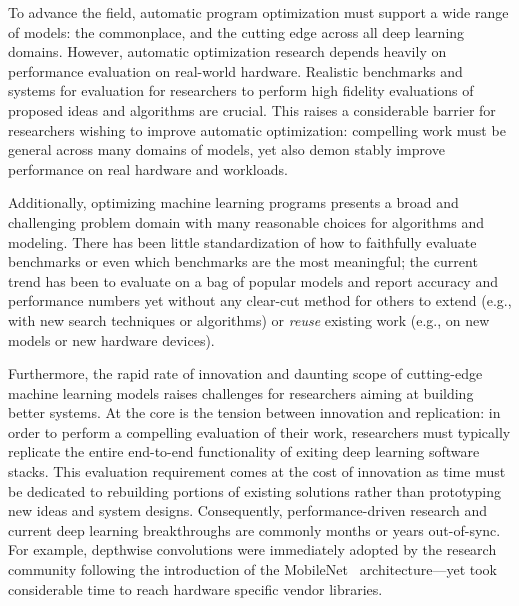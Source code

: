 To advance the field, automatic program optimization must support a wide range of models: the commonplace, and the cutting edge across all deep learning domains.
However, automatic optimization research depends heavily on performance evaluation on real-world hardware.
Realistic benchmarks and systems for evaluation for researchers to perform high fidelity evaluations of proposed ideas and algorithms are crucial.
This raises a considerable barrier for researchers wishing to improve automatic optimization: compelling work must be general across many domains of models, yet also demon stably improve performance on real hardware and workloads.

Additionally, optimizing machine learning programs presents a broad and challenging problem domain with many reasonable choices for algorithms and modeling.
There has been little standardization of how to faithfully evaluate benchmarks or even which benchmarks are the most meaningful; the current trend has been to evaluate on a bag of popular models and report accuracy and performance numbers yet without any clear-cut method for others to extend (e.g., with new search techniques or algorithms) or \emph{reuse} existing work (e.g., on new models or new hardware devices).

Furthermore, the rapid rate of innovation and daunting scope of cutting-edge machine learning models raises challenges for researchers aiming at building better systems.
At the core is the tension between innovation and replication: in order to perform a compelling evaluation of their work, researchers must typically replicate the entire end-to-end functionality of exiting deep learning software stacks.
This evaluation requirement comes at the cost of innovation as time must be dedicated to rebuilding portions of existing solutions rather than prototyping new ideas and system designs.
Consequently, performance-driven research and current deep learning breakthroughs are commonly months or years out-of-sync.
For example, depthwise convolutions were immediately adopted by the research community following the introduction of the MobileNet~\cite{DBLP:journals/corr/HowardZCKWWAA17} architecture---yet took considerable time to reach hardware specific vendor libraries. 

